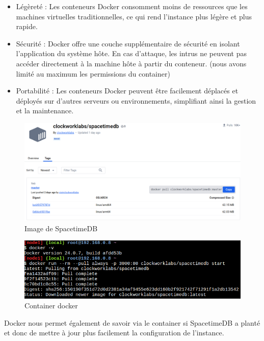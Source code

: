 \documentclass[
	article,			%
	11pt,				%
	oneside,			%
	a4paper,			%
	chapter=TITLE,
	french,			%
	sumario=tradicional
	]{base_nt}
\begin{document}
\begin{itemize}
    \item Légèreté : Les conteneurs Docker consomment moins de ressources que les machines virtuelles traditionnelles, ce qui rend l'instance plus légère et plus rapide.
    \item Sécurité : Docker offre une couche supplémentaire de sécurité en isolant l'application du système hôte. En cas d'attaque, les intrus ne peuvent pas accéder directement à la machine hôte à partir du conteneur. (nous avons limité au maximum les permissions du container)
    \item Portabilité : Les conteneurs Docker peuvent être facilement déplacés et déployés sur d'autres serveurs ou environnements, simplifiant ainsi la gestion et la maintenance.
\end{itemize}

\begin{figure}[ht]
	\caption{Image de SpacetimeDB}
	\centering
	\includegraphics[width=1\linewidth]{paper27.png}
	\legend{}
	
\end{figure}

\newpage

\begin{figure}[ht]
	\caption{Container docker}
	\centering
	\includegraphics[width=1\linewidth]{paper13.png}
	\legend{}
	
\end{figure}

Docker nous permet également de savoir via le container si SpacetimeDB a planté et donc de mettre à jour plus facilement la configuration de l'instance.
\end{document}
